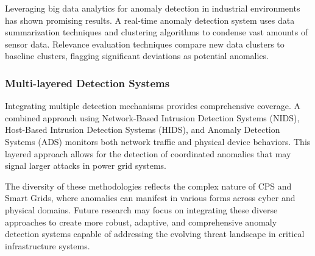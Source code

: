 Leveraging big data analytics for anomaly detection in industrial environments has shown promising results. A real-time anomaly detection system \cite{62} uses data summarization techniques and clustering algorithms to condense vast amounts of sensor data. Relevance evaluation techniques compare new data clusters to baseline clusters, flagging significant deviations as potential anomalies.

\subsubsection{Multi-layered Detection Systems}

Integrating multiple detection mechanisms provides comprehensive coverage. A combined approach using Network-Based Intrusion Detection Systems (NIDS), Host-Based Intrusion Detection Systems (HIDS), and Anomaly Detection Systems (ADS) \cite{93} monitors both network traffic and physical device behaviors. This layered approach allows for the detection of coordinated anomalies that may signal larger attacks in power grid systems.

The diversity of these methodologies reflects the complex nature of CPS and Smart Grids, where anomalies can manifest in various forms across cyber and physical domains. Future research may focus on integrating these diverse approaches to create more robust, adaptive, and comprehensive anomaly detection systems capable of addressing the evolving threat landscape in critical infrastructure systems.


